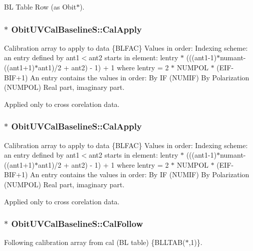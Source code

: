 BL Table Row (as Obit$\ast$). 

\subsubsection{$\ast$ {\bf Obit\-UVCal\-Baseline\-S::Cal\-Apply}}\label{structObitUVCalBaselineS_o31}


Calibration array to apply to data \{BLFAC\} Values in order: Indexing scheme: an entry defined by ant1$<$ant2 starts in element: lentry $\ast$ (((ant1-1)$\ast$numant-((ant1+1)$\ast$ant1)/2 + ant2) - 1) + 1 where lentry = 2 $\ast$ NUMPOL $\ast$ (EIF-BIF+1) An entry contains the values in order: By IF (NUMIF) By Polarization (NUMPOL) Real part, imaginary part. 

Applied only to cross corelation data. 
\subsubsection{$\ast$ {\bf Obit\-UVCal\-Baseline\-S::Cal\-Apply}}\label{structObitUVCalBaselineS_o26}


Calibration array to apply to data \{BLFAC\} Values in order: Indexing scheme: an entry defined by ant1$<$ant2 starts in element: lentry $\ast$ (((ant1-1)$\ast$numant-((ant1+1)$\ast$ant1)/2 + ant2) - 1) + 1 where lentry = 2 $\ast$ NUMPOL $\ast$ (EIF-BIF+1) An entry contains the values in order: By IF (NUMIF) By Polarization (NUMPOL) Real part, imaginary part. 

Applied only to cross corelation data. 
\subsubsection{$\ast$ {\bf Obit\-UVCal\-Baseline\-S::Cal\-Follow}}\label{structObitUVCalBaselineS_o33}


Following calibration array from cal (BL table) \{BLLTAB($\ast$,1)\}. 

